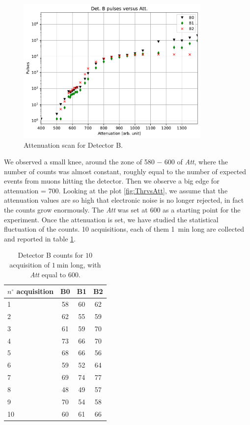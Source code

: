 \begin{figure}[!ht]
\centering
\includegraphics[width = 0.85\textwidth]{Analysis/AttenuationB.pdf}
\caption{Attenuation scan for Detector B.}
\label{fig:AttB}
\end{figure}

We observed a small knee, around the zone of 580 − 600 of \textit{Att}, where the number of counts was almost constant, roughly equal to the number of expected events from muons hitting the detector. Then we observe a big edge for attenuation = 700. Looking at the plot \ref{fig:ThrvsAtt}, we assume that the attenuation values are so high that electronic noise is no longer rejected, in fact the counts grow enormously. The \textit{Att} was set at 600 as a starting point for the experiment.
Once the attenuation is set, we have studied the statistical fluctuation of the counts. 10 acquisitions, each of them \SI{1}{\minute} long are collected and reported in table \ref{tab:CountB}.

\begin{table}[!htb]
\centering
\begin{tabular}{l|c|c|c}
\hline 
$n^{\circ}$ acquisition & B0 & B1 & B2 \\
\hline 
1 & 58 & 60 & 62 \\  
2 & 62 & 55 & 59 \\ 
3 & 61 & 59 & 70 \\ 
4 & 73 & 66 & 70 \\ 
5 & 68 & 66 & 56 \\ 
6 & 59 & 52 & 64 \\ 
7 & 69 & 74 & 77 \\
8 & 48 & 49 & 57 \\ 
9 & 70 & 54 & 58 \\ 
10 & 60 & 61 & 66\\
\hline
\end{tabular} 
\caption{Detector B counts for $10$ acquisition of $\SI{1}{\minute}$ long, with \textit{Att} equal to 600.}
\label{tab:CountB}
\end{table}

